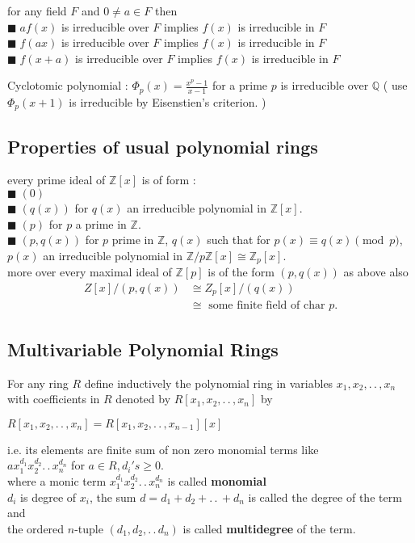 \documentclass[11pt]{extarticle}
\newcommand{\Z}{\mathbb{Z}}
\newcommand{\Q}{\mathbb{Q}}
\newcommand{\w}[1]{\text{#1}}
\newcommand{\ck}{.\,.\,}
\newcommand{\snote}[1]{{\footnotesize(#1)}}
\newcommand{\tbx}[2][]{
	\begin{tcolorbox}[enhanced,breakable,size=small,colback=black!2!white,title={#1},arc is angular, arc=1.5mm,drop fuzzy shadow]
		#2
	\end{tcolorbox}
}
\newcommand{\y}{$\blacksquare\;$}
\begin{document}
\begin{multicols}{2}
\tbx{for any field $ F $ and $ 0\neq a\in F $ then \\
\y $ af(x) $ is irreducible over $ F $ implies $ f(x) $ is irreducible in $ F $ \\  
\y $ f(ax) $ is irreducible over $ F $ implies $ f(x) $ is irreducible in $ F $ \\
\y $ f(x+a) $ is irreducible over $ F $ implies $ f(x) $ is irreducible in $ F $ 
}

\tbx{Cyclotomic polynomial : $\Phi_p(x)=  \frac{ x^p-1 }{x-1}  $ for a prime $ p $ is irreducible over $ \Q $ \snote{ use $ \Phi_p(x+1) $ is irreducible by Eisenstien's criterion. }
			 }
\subsection{Properties of usual polynomial rings}

\tbx[polynomial ring in $ \Z $]{ every prime ideal of $\Z[x]$ is of form : \\
	\y $ (0) $ \\
	\y $(q(x))$ for $ q(x) $ an irreducible polynomial in $ \Z[x]. $ \\
	\y $(p)$ for $ p $ a prime in $ \Z .$\\
	\y $ (p,q(x)) $ for $ p $  prime in $ \Z $, $ q(x) $ such that for $ p(x)\equiv q(x)\pmod p $, $ p(x) $ an irreducible polynomial in $ \Z/p\Z[x] \cong \Z_p[x]. $\\
	more over every maximal ideal of $ \Z[p] $ is of the form  $ (p,q(x)) $  as above also 
	\begin{align*}
		 Z[x]/(p,q(x))&\cong Z_p[x]/(q(x)) \\
		 & \cong\w{ some finite field of char }p. 
		\end{align*} }

			

		\subsection{ Multivariable Polynomial Rings }

\tbx{For any ring $ R $ define inductively the polynomial ring in variables $ x_1,x_2,\ck , x_n $ with coefficients in $ R $ denoted by $ R[x_1,x_2,\ck , x_n] $ by 
			\begin{center}
				$ R[x_1,x_2,\ck , x_n] =R[x_1,x_2,\ck , x_{n-1}][x] $
			\end{center}
			i.e. its elements are finite sum of non zero monomial terms like \\
			$ ax_1^{d_1}x_2^{d_2}\ck x_n^{d_n} $ for $ a\in R, d_i's\geq 0 .$\\
			where a monic term $  x_1^{d_1}x_2^{d_2}\ck x_n^{d_n} $ is called \textbf{monomial}\\
			$ d_i $ is degree of $ x_i $, the sum $ d=d_1+d_2+\ck +d_n $ is called the degree of the term and \\
			the ordered $ n $-tuple $ (d_1,d_2,\ck d_n) $  is called \textbf{ multidegree } of the term.}


\end{multicols}
\end{document}
